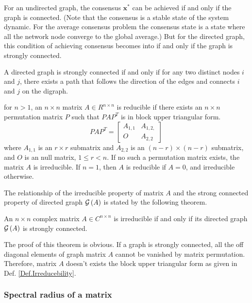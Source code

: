 For an undirected graph, the consensus $\mathbf{x}^{*}$ can be achieved
if and only if the graph is connected. (Note that the consensus is
a stable state of the system dynamic. For the average consensus problem
the consensus state is a state where all the network node converge
to the global average.) But for the directed graph, this condition
of achieving consensus becomes into if and only if the graph is strongly
connected. 

A directed graph is strongly connected if and only if for any two
distinct nodes $i$ and $j$, there exists a path that follows the
direction of the edges and connects $i$ and $j$ on the digraph. 
\begin{defn}
\label{Def.Irreducebility}for $n>1$, an $n\times n$ matrix $A\in R^{n\times n}$
is reducible if there exists an $n\times n$ permutation matrix $P$
such that $PAP^{T}$ is in block upper triangular form. 
\begin{equation}
PAP^{T}=\left[\begin{array}{cc}
A_{1,1} & A_{1,2,}\\
O & A_{2,2}
\end{array}\right]
\end{equation}
where $A_{1,1}$ is an $r\times r$ submatrix and $A_{2,2}$ is an
$\left(n-r\right)\times\left(n-r\right)$ submatrix, and $O$ is an
null matrix, $1\leq r<n$. If no such a permutation matrix exists,
the matrix $A$ is irreducible. If $n=1$, then $A$ is reducible
if $A=0$, and irreducible otherwise. 
\end{defn}
The relationship of the irreducible property of matrix $A$ and the
strong connected property of directed graph ${\cal G}\left(A\right)$
is stated by the following theorem.
\begin{thm}
An $n\times n$ complex matrix $A\in C^{n\times n}$ is irreducible
if and only if its directed graph ${\cal G}\left(A\right)$ is strongly
connected. \cite{Varga2010}
\end{thm}
The proof of this theorem is obvious. If a graph is strongly connected,
all the off diagonal elements of graph matrix $A$ cannot be vanished
by matrix permutation. Therefore, matrix $A$ doesn't exists the block
upper triangular form as given in Def. \ref{Def.Irreducebility}. 


\subsubsection{Spectral radius of a matrix}


